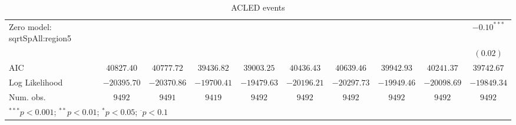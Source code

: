 \begin{table}
\begin{center}
{\begin{tabular}{l c c c c c c c c c}
Zero model: sqrtSpAll:region5  &                &                &               &               &               &                 &               &               & $-0.10^{***}$   \\
                               &                &                &               &               &               &                 &               &               & $(0.02)$        \\
\midrule
AIC                            & $40827.40$     & $40777.72$     & $39436.82$    & $39003.25$    & $40436.43$    & $40639.46$      & $39942.93$    & $40241.37$    & $39742.67$      \\
Log Likelihood                 & $-20395.70$    & $-20370.86$    & $-19700.41$   & $-19479.63$   & $-20196.21$   & $-20297.73$     & $-19949.46$   & $-20098.69$   & $-19849.34$     \\
Num. obs.                      & $9492$         & $9491$         & $9419$        & $9492$        & $9492$        & $9492$          & $9492$        & $9492$        & $9492$          \\
\bottomrule
\multicolumn{10}{l}{\scriptsize{$^{***}p<0.001$; $^{**}p<0.01$; $^{*}p<0.05$; $^{\cdot}p<0.1$}}
\end{tabular}
}
\caption{ACLED
	       events}
\label{zacledev}
\end{center}
\end{table}
